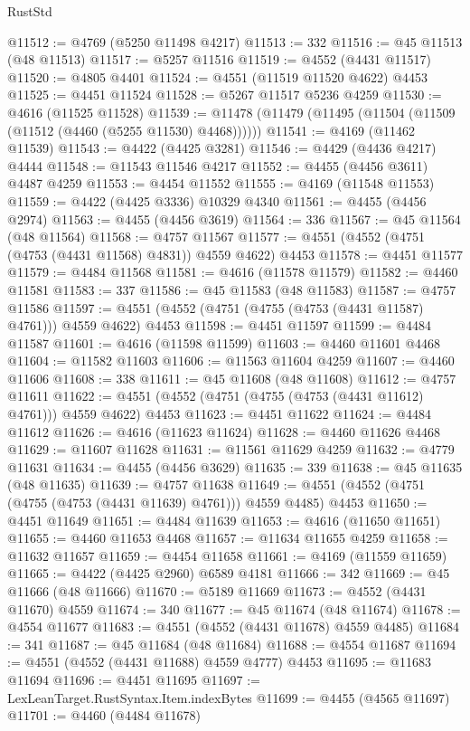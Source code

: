 \begin{lexlean}{RustStd}
\begin{coremodule}
@11512 := @4769 (@5250 @11498 @4217)
@11513 := 332
@11516 := @45 @11513 (@48 @11513)
@11517 := @5257 @11516
@11519 := @4552 (@4431 @11517)
@11520 := @4805 @4401
@11524 := @4551 (@11519 @11520 @4622) @4453
@11525 := @4451 @11524
@11528 := @5267 @11517 @5236 @4259
@11530 := @4616 (@11525 @11528)
@11539 := @11478 (@11479 (@11495 (@11504 (@11509 (@11512 (@4460 (@5255 @11530) @4468))))))
@11541 := @4169 (@11462 @11539)
@11543 := @4422 (@4425 @3281)
@11546 := @4429 (@4436 @4217) @4444
@11548 := @11543 @11546 @4217
@11552 := @4455 (@4456 @3611) @4487 @4259
@11553 := @4454 @11552
@11555 := @4169 (@11548 @11553)
@11559 := @4422 (@4425 @3336) @10329 @4340
@11561 := @4455 (@4456 @2974)
@11563 := @4455 (@4456 @3619)
@11564 := 336
@11567 := @45 @11564 (@48 @11564)
@11568 := @4757 @11567
@11577 := @4551 (@4552 (@4751 (@4753 (@4431 @11568) @4831)) @4559 @4622) @4453
@11578 := @4451 @11577
@11579 := @4484 @11568
@11581 := @4616 (@11578 @11579)
@11582 := @4460 @11581
@11583 := 337
@11586 := @45 @11583 (@48 @11583)
@11587 := @4757 @11586
@11597 := @4551 (@4552 (@4751 (@4755 (@4753 (@4431 @11587) @4761))) @4559 @4622) @4453
@11598 := @4451 @11597
@11599 := @4484 @11587
@11601 := @4616 (@11598 @11599)
@11603 := @4460 @11601 @4468
@11604 := @11582 @11603
@11606 := @11563 @11604 @4259
@11607 := @4460 @11606
@11608 := 338
@11611 := @45 @11608 (@48 @11608)
@11612 := @4757 @11611
@11622 := @4551 (@4552 (@4751 (@4755 (@4753 (@4431 @11612) @4761))) @4559 @4622) @4453
@11623 := @4451 @11622
@11624 := @4484 @11612
@11626 := @4616 (@11623 @11624)
@11628 := @4460 @11626 @4468
@11629 := @11607 @11628
@11631 := @11561 @11629 @4259
@11632 := @4779 @11631
@11634 := @4455 (@4456 @3629)
@11635 := 339
@11638 := @45 @11635 (@48 @11635)
@11639 := @4757 @11638
@11649 := @4551 (@4552 (@4751 (@4755 (@4753 (@4431 @11639) @4761))) @4559 @4485) @4453
@11650 := @4451 @11649
@11651 := @4484 @11639
@11653 := @4616 (@11650 @11651)
@11655 := @4460 @11653 @4468
@11657 := @11634 @11655 @4259
@11658 := @11632 @11657
@11659 := @4454 @11658
@11661 := @4169 (@11559 @11659)
@11665 := @4422 (@4425 @2960) @6589 @4181
@11666 := 342
@11669 := @45 @11666 (@48 @11666)
@11670 := @5189 @11669
@11673 := @4552 (@4431 @11670) @4559
@11674 := 340
@11677 := @45 @11674 (@48 @11674)
@11678 := @4554 @11677
@11683 := @4551 (@4552 (@4431 @11678) @4559 @4485)
@11684 := 341
@11687 := @45 @11684 (@48 @11684)
@11688 := @4554 @11687
@11694 := @4551 (@4552 (@4431 @11688) @4559 @4777) @4453
@11695 := @11683 @11694
@11696 := @4451 @11695
@11697 := LexLeanTarget.RustSyntax.Item.indexBytes
@11699 := @4455 (@4565 @11697)
@11701 := @4460 (@4484 @11678)

\end{coremodule}
\end{lexlean}
